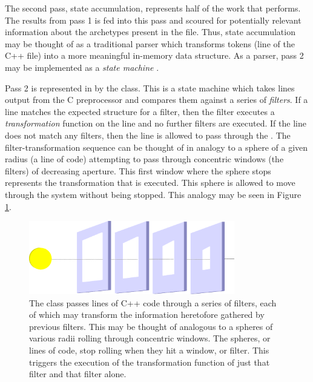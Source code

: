 The second pass, state accumulation, represents half of the work that \cycpp performs.
The results from pass 1 is fed into this pass and scoured for 
potentially relevant information about the archetypes present in the file. 
Thus, state accumulation 
may be thought of as a traditional parser which transforms tokens (line of the 
C++ file) into a more meaningful in-memory data structure. As a parser, pass 2 
may be implemented as a \emph{state machine} \cite{mertz2003text,wagner2006modeling}.

Pass 2 is represented in \cycpp by the  class.  This is a
state machine which takes lines output from the C preprocessor and compares them 
against a series of \emph{filters}.  If a line matches the expected structure 
for a filter, then the filter executes a \emph{transformation} function on the 
line and no further filters are executed. If the line does not match any 
filters, then the line is allowed to pass through the .  
The filter-transformation sequence can be thought of in analogy to a sphere of 
a given radius (a line of code) attempting to pass through concentric windows 
(the filters) of decreasing aperture. This first window where the sphere stops 
represents the transformation that is executed.  This sphere is allowed to move 
through the system without being stopped. This analogy may be seen in Figure 
\ref{filter-analogy}.  

\begin{figure}[htbc]
\label{filter-analogy}
\centering
\includegraphics[width=0.8\textwidth]{filter-analogy.eps}
\caption{The  class passes lines of C++ code through 
a series of filters, each of which may transform the information heretofore gathered
by previous filters. 
This may be thought of analogous to a spheres of various radii rolling through 
concentric windows.  The spheres, or lines of code, stop rolling when they hit a  
window, or filter. This triggers the execution of the transformation function of just 
that filter and that filter alone.}
\end{figure}

